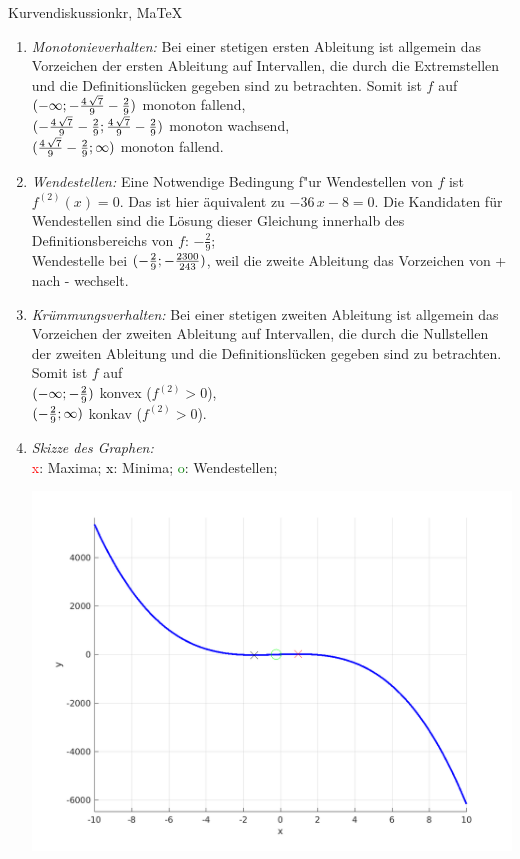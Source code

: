 \begin{MAufgabe}{Kurvendiskussion}{kr, MaTeX}
\begin{enumerate}
 \item \emph{Monotonieverhalten:} 
 Bei einer stetigen ersten Ableitung ist allgemein das Vorzeichen der ersten Ableitung auf Intervallen, die durch die Extremstellen und die Definitionsl\"ucken gegeben sind zu betrachten. Somit ist $f$ auf \\ 
 $(-\infty; - \frac{4\, \sqrt{7}}{9} - \frac{2}{9})$ monoton fallend, \\ 
 $( - \frac{4\, \sqrt{7}}{9} - \frac{2}{9};\frac{4\, \sqrt{7}}{9} - \frac{2}{9})$ monoton  wachsend, \\ 
 $(\frac{4\, \sqrt{7}}{9} - \frac{2}{9}; \infty)$ monoton fallend. \\ 
 \item \emph{Wendestellen:} 
 Eine Notwendige Bedingung f"ur Wendestellen von $f$ ist $f^{(2)}(x)=0$. 
 Das ist hier \"aquivalent zu $ - 36\, x - 8=0$. 
 Die Kandidaten f\"ur Wendestellen sind die L\"osung dieser Gleichung innerhalb des Definitionsbereichs von $f$: $- \frac{2}{9}$; \\ 
 Wendestelle bei $(- \frac{2}{9};- \frac{2300}{243})$, weil die zweite Ableitung das Vorzeichen von + nach - wechselt. \\ 
 \item \emph{Kr\"ummungsverhalten:} 
 Bei einer stetigen zweiten Ableitung ist allgemein das Vorzeichen der zweiten Ableitung auf Intervallen, die durch die Nullstellen der zweiten Ableitung und die Definitionsl\"ucken gegeben sind zu betrachten. 
 Somit ist $f$ auf \\ 
 $(-\infty ;- \frac{2}{9})$  konvex ($f^{(2)}>0$), \\ 
 $(- \frac{2}{9}; \infty)$  konkav ($f^{(2)}>0$). \\ 
 \item \emph{Skizze des Graphen:} \\ 
 {\textcolor{red} x}: Maxima; {\textcolor{black} x}: Minima; {\textcolor{green} o}: Wendestellen; 
  \begin{center}
  \includegraphics[width=0.8\linewidth]{Abb_zur_Ag_autogenerated_fractions_26.png} \end{center}
  
 \end{enumerate}
 \else\relax\fi
  \end{MAufgabe}